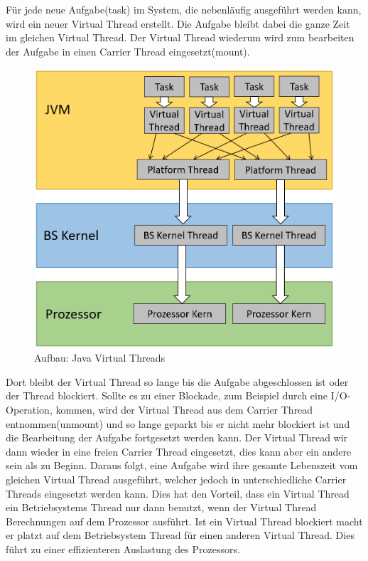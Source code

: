 \documentclass[fontsize=12pt,paper=a4,twoside=semi,parskip=half-,headsepline,headinclude]{scrreprt}
\begin{document}
Für jede neue Aufgabe(task) im System, die nebenläufig ausgeführt werden kann, wird ein neuer Virtual Thread erstellt. Die Aufgabe bleibt dabei die ganze Zeit im gleichen Virtual Thread. Der Virtual Thread wiederum wird zum bearbeiten der Aufgabe in einen Carrier Thread eingesetzt(mount). 

\begin{figure}[h]
	\centering
	\includegraphics[scale=0.5]{figures/VirtualThreads.png}
	\caption{Aufbau: Java Virtual Threads}
	\label{fig:VirtualThreads}
\end{figure}


Dort bleibt der Virtual Thread so lange bis die Aufgabe abgeschlossen ist oder der Thread blockiert. Sollte es zu einer Blockade, zum Beispiel durch eine I/O-Operation, kommen, wird der Virtual Thread aus dem Carrier Thread entnommen(unmount) und so lange geparkt bis er nicht mehr blockiert ist und die Bearbeitung der Aufgabe fortgesetzt werden kann. Der Virtual Thread wir dann wieder in eine freien Carrier Thread eingesetzt, dies kann aber ein andere sein als zu Beginn. Daraus folgt, eine Aufgabe wird ihre gesamte Lebenszeit vom gleichen Virtual Thread ausgeführt, welcher jedoch in unterschiedliche Carrier Threads eingesetzt werden kann. Dies hat den Vorteil, dass ein Virtual Thread ein Betriebsystems Thread nur dann benutzt, wenn der Virtual Thread Berechnungen auf dem Prozessor ausführt. Ist ein Virtual Thread blockiert macht er platzt auf dem Betriebsystem Thread für einen anderen Virtual Thread. Dies führt zu einer effizienteren Auslastung des Prozessors.\cite{Bateman2023}
\end{document}
